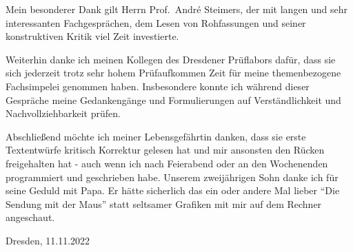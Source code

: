 \documentclass [oneside,10pt,a4paper,ngerman,BCOR10mm,headsepline,parindent,final]{scrartcl}
\begin{document}
Mein besonderer Dank gilt Herrn Prof.~André Steimers, der mit langen und
sehr interessanten Fachgesprächen, dem Lesen von Rohfassungen und seiner
konstruktiven Kritik viel Zeit investierte.

Weiterhin danke ich meinen Kollegen des Dresdener Prüflabors dafür, dass
sie sich jederzeit trotz sehr hohem Prüfaufkommen Zeit für meine
themenbezogene Fachsimpelei genommen haben. Insbesondere konnte ich
während dieser Gespräche meine Gedankengänge und Formulierungen auf
Verständlichkeit und Nachvollziehbarkeit prüfen.

Abschließend möchte ich meiner Lebensgefährtin danken, dass sie erste
Textentwürfe kritisch Korrektur gelesen hat und mir ansonsten den Rücken
freigehalten hat - auch wenn ich nach Feierabend oder an den Wochenenden
programmiert und geschrieben habe. Unserem zweijährigen Sohn danke ich
für seine Geduld mit Papa. Er hätte sicherlich das ein oder andere Mal
lieber ``Die Sendung mit der Maus'' statt seltsamer Grafiken mit mir auf
dem Rechner angeschaut.

Dresden, 11.11.2022


    
    
    \printbibheading[heading=bibnumbered]
    \printbibliography[heading=subbibliography,keyword={URL},title={Online references}]
    \printbibliography[heading=subbibliography,keyword={book},title={Books, technical reports and others}]
    
\end{document}
